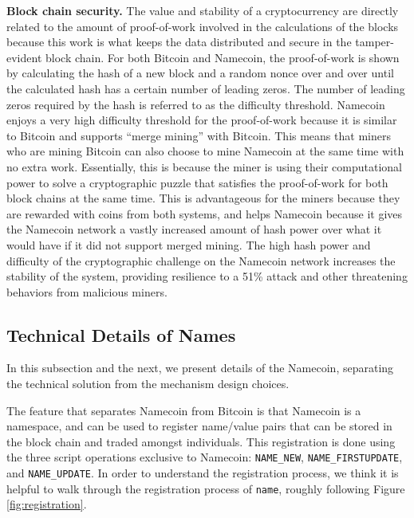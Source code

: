 {\bf Block chain security.}
The value and stability of a cryptocurrency are directly related to the amount of proof-of-work involved in the calculations of the blocks because this work is what keeps the data distributed and secure in the tamper-evident block chain. For both Bitcoin and Namecoin, the proof-of-work is shown by calculating the hash of a new block and a random nonce over and over until the calculated hash has a certain number of leading zeros. The number of leading zeros required by the hash is referred to as the difficulty threshold. Namecoin enjoys a very high difficulty threshold for the proof-of-work because it is similar to Bitcoin and supports ``merge mining'' with Bitcoin. This means that miners who are mining Bitcoin can also choose to mine Namecoin at the same time with no extra work. Essentially, this is because the miner is using their computational power to solve a cryptographic puzzle that satisfies the proof-of-work for both block chains at the same time. This is advantageous for the miners because they are rewarded with coins from both systems, and helps Namecoin because it gives the Namecoin network a vastly increased amount of hash power over what it would have if it did not support merged mining. The high hash power and difficulty of the cryptographic challenge on the Namecoin network increases the stability of the system, providing resilience to a 51\% attack and other threatening behaviors from malicious miners.

\subsection{Technical Details of Names}

In this subsection and the next, we present details of the Namecoin, separating the technical solution from the mechanism design choices. 

The feature that separates Namecoin from Bitcoin is that Namecoin is a namespace, and can be used to register name/value pairs that can be stored in the block chain and traded amongst individuals. This registration is done using the three script operations exclusive to Namecoin: {\tt NAME\_NEW}, {\tt NAME\_FIRSTUPDATE}, and {\tt NAME\_UPDATE}. In order to understand the registration process, we think it is helpful to walk through the registration process of {\tt name}, roughly following Figure \ref{fig:registration}. 

